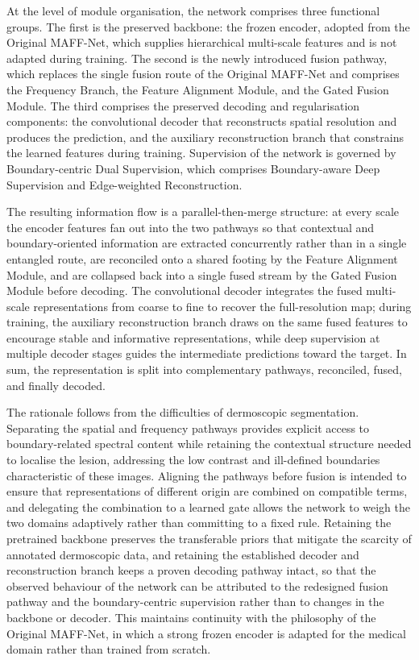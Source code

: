 At the level of module organisation, the network comprises three functional groups. The first is the preserved backbone: the frozen encoder, adopted from the Original MAFF-Net, which supplies hierarchical multi-scale features and is not adapted during training. The second is the newly introduced fusion pathway, which replaces the single fusion route of the Original MAFF-Net and comprises the Frequency Branch, the Feature Alignment Module, and the Gated Fusion Module. The third comprises the preserved decoding and regularisation components: the convolutional decoder that reconstructs spatial resolution and produces the prediction, and the auxiliary reconstruction branch that constrains the learned features during training. Supervision of the network is governed by Boundary-centric Dual Supervision, which comprises Boundary-aware Deep Supervision and Edge-weighted Reconstruction.

The resulting information flow is a parallel-then-merge structure: at every scale the encoder features fan out into the two pathways so that contextual and boundary-oriented information are extracted concurrently rather than in a single entangled route, are reconciled onto a shared footing by the Feature Alignment Module, and are collapsed back into a single fused stream by the Gated Fusion Module before decoding. The convolutional decoder integrates the fused multi-scale representations from coarse to fine to recover the full-resolution map; during training, the auxiliary reconstruction branch draws on the same fused features to encourage stable and informative representations, while deep supervision at multiple decoder stages guides the intermediate predictions toward the target. In sum, the representation is split into complementary pathways, reconciled, fused, and finally decoded.

The rationale follows from the difficulties of dermoscopic segmentation. Separating the spatial and frequency pathways provides explicit access to boundary-related spectral content while retaining the contextual structure needed to localise the lesion, addressing the low contrast and ill-defined boundaries characteristic of these images. Aligning the pathways before fusion is intended to ensure that representations of different origin are combined on compatible terms, and delegating the combination to a learned gate allows the network to weigh the two domains adaptively rather than committing to a fixed rule. Retaining the pretrained backbone preserves the transferable priors that mitigate the scarcity of annotated dermoscopic data, and retaining the established decoder and reconstruction branch keeps a proven decoding pathway intact, so that the observed behaviour of the network can be attributed to the redesigned fusion pathway and the boundary-centric supervision rather than to changes in the backbone or decoder. This maintains continuity with the philosophy of the Original MAFF-Net, in which a strong frozen encoder is adapted for the medical domain rather than trained from scratch.

